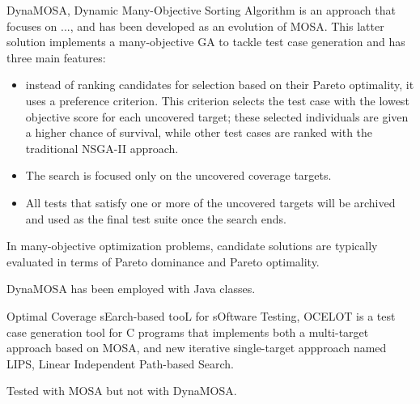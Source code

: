 DynaMOSA, Dynamic Many-Objective Sorting Algorithm \cite{DBLP:journals/tse/PanichellaKT18} is an approach that focuses on ..., and has been developed as an evolution of MOSA. This latter solution implements a many-objective GA to tackle test case generation and has three main features: 
\begin{itemize}
    \item instead of ranking candidates for selection based on their Pareto optimality, it uses a preference criterion. This criterion selects the test case with the lowest objective score for each uncovered target; these selected individuals are given a higher chance of survival, while other test cases are ranked with the traditional NSGA-II approach.
    \item The search is focused only on the uncovered coverage targets.
    \item All tests that satisfy one or more of the uncovered targets will be archived and used as the final test suite once the search ends.
\end{itemize}

In many-objective optimization problems, candidate solutions are typically evaluated in terms of Pareto dominance and Pareto optimality.

DynaMOSA has been employed with Java classes.



Optimal Coverage sEarch-based tooL for sOftware Testing, OCELOT \cite{DBLP:conf/ssbse/ScalabrinoGNOL16} is a test case generation tool for C programs that implements both a multi-target approach based on MOSA, and new iterative single-target appproach named LIPS, Linear Independent Path-based Search.

Tested with MOSA but not with DynaMOSA.